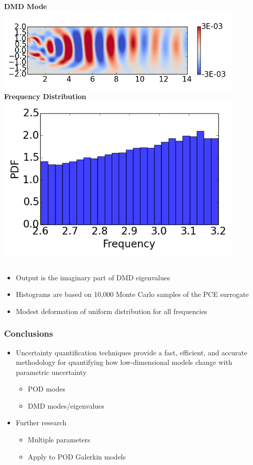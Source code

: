 \documentclass[9pt]{beamer}
\begin{document}
\begin{frame}
\begin{columns}[c]
   \centering
    \textbf{DMD Mode} \\
    \includegraphics[width=0.9\textwidth]{DMDMode3} \\
    \textbf{Frequency Distribution} \\
    \includegraphics[width=0.9\textwidth]{PerturbDMDEigFastPDF}
\end{columns}

\begin{itemize}
\item Output is the imaginary part of DMD eigenvalues
\item Histograms are based on 10,000 Monte Carlo samples of the PCE surrogate
\item Modest deformation of uniform distribution for all frequencies
\end{itemize}
\end{frame}
\begin{frame}
\frametitle{Conclusions}
\label{sec-3-8}

\begin{itemize}
\item Uncertainty quantification techniques provide a fast, efficient, and
  accurate methodology for quantifying how low-dimensional models
  change with parametric uncertainty
\begin{itemize}
\item POD modes
\item DMD modes/eigenvalues
\end{itemize}
\item Further research
\begin{itemize}
\item Multiple parameters
\item Apply to POD Galerkin models
\end{itemize}
\end{itemize}
\end{frame}
\end{document}
